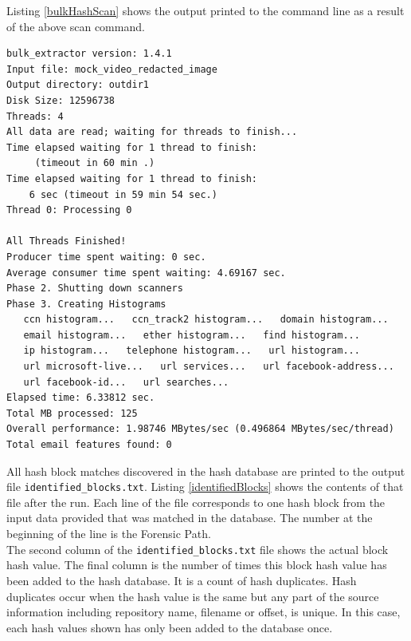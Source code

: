 \documentclass[11pt,fleqn]{article} %
\begin{document}
Listing \ref{bulkHashScan} shows the output printed to the command line as a result of the above \bulk \hdb scan command. \\

\lstset{style=customfile}
\begin{lstlisting}[float, caption=Output from \bulk \hdb scan, label=bulkHashScan]
bulk_extractor version: 1.4.1
Input file: mock_video_redacted_image
Output directory: outdir1
Disk Size: 12596738
Threads: 4
All data are read; waiting for threads to finish...
Time elapsed waiting for 1 thread to finish:
     (timeout in 60 min .)
Time elapsed waiting for 1 thread to finish:
    6 sec (timeout in 59 min 54 sec.)
Thread 0: Processing 0

All Threads Finished!
Producer time spent waiting: 0 sec.
Average consumer time spent waiting: 4.69167 sec.
Phase 2. Shutting down scanners
Phase 3. Creating Histograms
   ccn histogram...   ccn_track2 histogram...   domain histogram...
   email histogram...   ether histogram...   find histogram...
   ip histogram...   telephone histogram...   url histogram...
   url microsoft-live...   url services...   url facebook-address...
   url facebook-id...   url searches...
Elapsed time: 6.33812 sec.
Total MB processed: 125
Overall performance: 1.98746 MBytes/sec (0.496864 MBytes/sec/thread)
Total email features found: 0
\end{lstlisting}

All hash block matches discovered in the hash database are printed to the \bulk output file \texttt{identified\_blocks.txt}. Listing \ref{identifiedBlocks} shows the contents of that file after the \bulk run. Each line of the file corresponds to one hash block from the input data provided that was matched in the database. The number at the beginning of the line is the Forensic Path.\\


The second column of the \texttt{identified\_blocks.txt} file shows the actual block hash value. The final column is the number of times this block hash value has been added to the hash database. It is a count of hash duplicates. Hash duplicates occur when the hash value is the same but any part of the source information including repository name, filename or offset, is unique. In this case, each hash values shown has only been added to the database once.\\
\end{document}
